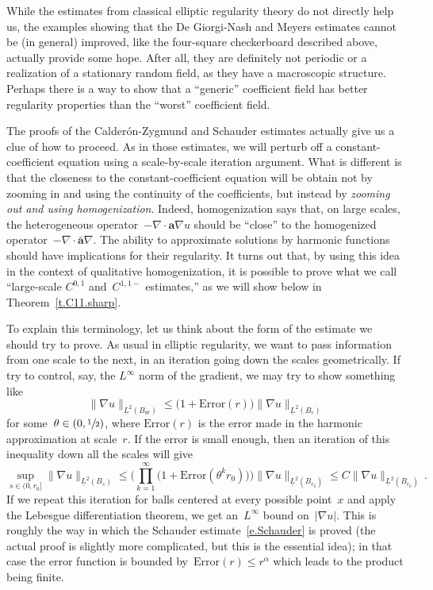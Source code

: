\documentclass[11pt]{article} %
\numberwithin{equation}{section}
\theoremstyle{definition}
\renewcommand{\a}{\mathbf{a}}
\newcommand{\ahom}{\bar{\a}}
\begin{document}
\smallskip

While the estimates from classical elliptic regularity theory do not directly help us, the examples showing that the De Giorgi-Nash and Meyers estimates cannot be (in general) improved, like the four-square checkerboard described above, actually provide some hope. After all, they are definitely not periodic or a realization of a stationary random field, as they have a macroscopic structure. 
Perhaps there is a way to show that a ``generic'' coefficient field has better regularity properties than the ``worst'' coefficient field. 

\smallskip

The proofs of the Calder\'on-Zygmund and Schauder estimates actually give us a clue of how to proceed. 
As in those estimates, we will perturb off a constant-coefficient equation using a scale-by-scale iteration argument. What is different is that the closeness to the constant-coefficient equation will be obtain not by zooming in and using the continuity of the coefficients, but instead by \emph{zooming out and using homogenization}. 
Indeed, homogenization says that, on large scales, the heterogeneous operator~$-\nabla \cdot \a\nabla u$ should be ``close'' to the homogenized operator~$-\nabla \cdot \ahom\nabla$. 
The ability to approximate solutions by harmonic functions should have implications for their regularity.
It turns out that, by using this idea in the context of qualitative homogenization, it is possible to prove what we call ``large-scale $C^{0,1}$ and~$C^{1,1-}$ estimates,'' as we will show below in Theorem~\ref{t.C11.sharp}. 

\smallskip

To explain this terminology, let us think about the form of the estimate we should try to prove. 
As usual in elliptic regularity, we want to pass information from one scale to the next, in an iteration going down the scales geometrically. 
If try to control, say, the $L^\infty$ norm of the gradient, we may try to show something like 
\begin{equation*}
\| \nabla u \|_{\underline{L}^2(B_{\theta r})}
\leq
\bigl( 1 + \mathrm{Error}(r) \bigr)
\| \nabla u \|_{\underline{L}^2(B_r)}
\end{equation*}
for some~$\theta \in (0,\sfrac12)$, where $\mathrm{Error}(r)$ is the error made in the harmonic approximation at scale~$r$. 
If the error is small enough, then an iteration of this inequality down all the scales will give
\begin{equation*}
\sup_{s\in (0,r_0]} 
\| \nabla u \|_{\underline{L}^2(B_{s})}
\leq 
\Biggl( \prod_{k=1}^\infty
\bigl( 1 + \mathrm{Error}(\theta^k r_0 ) \bigr)
\Biggr) \| \nabla u \|_{\underline{L}^2(B_{r_0})}
\leq
C \| \nabla u \|_{\underline{L}^2(B_{r_0})}
\,.
\end{equation*}
If we repeat this iteration for balls centered at every possible point~$x$ and apply the Lebesgue differentiation theorem, we get an~$L^\infty$ bound on~$|\nabla u|$. This is roughly the way in which the Schauder estimate~\eqref{e.Schauder} is proved (the actual proof is slightly more complicated, but this is the essential idea); in that case the error function is bounded by~$\mathrm{Error}(r) \leq r^{\alpha}$ which leads to the product being finite.
\end{document}
